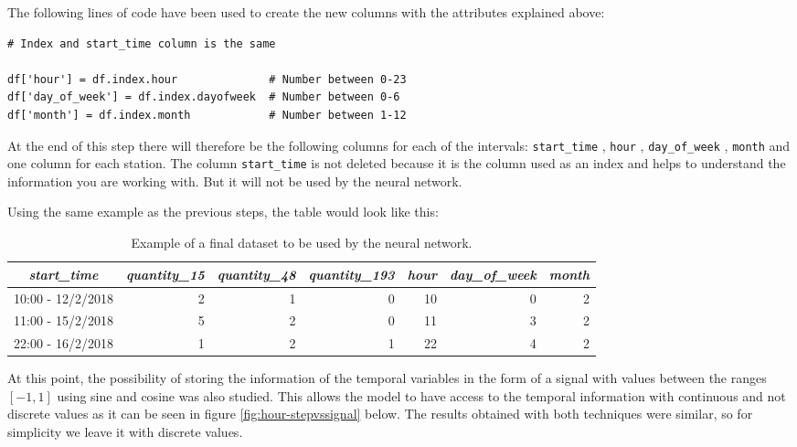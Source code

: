 \begin{enumerate}
  The following lines of code have been used to create the new columns with the attributes explained above:
    \begin{verbatim}
# Index and start_time column is the same

df['hour'] = df.index.hour              # Number between 0-23
df['day_of_week'] = df.index.dayofweek  # Number between 0-6
df['month'] = df.index.month            # Number between 1-12
    \end{verbatim}
    
    At the end of this step there will therefore be the following columns for each of the intervals: \small{\verb|start_time|} \normalsize , \small{\verb|hour|} \normalsize , \small{\verb|day_of_week|} \normalsize , \small{\verb|month|} \normalsize  and one column for each station. The column \small{\verb|start_time|} \normalsize  is not deleted because it is the column used as an index and helps to understand the information you are working with. But it will not be used by the neural network.
    \newline
    
    Using the same example as the previous steps, the table would look like this:
    \begin{table}[H]
    \footnotesize
    \centering
    \begin{tabular}{c|rrr|rrr}
        \toprule
        \textit{start\_time} & \textit{quantity\_15} & \textit{quantity\_48} & \textit{quantity\_193} & \textit{hour} & \textit{day\_of\_week} & \textit{month} \\
        \midrule
        10:00 - 12/2/2018 & 2 & 1 & 0 & 10 & 0 & 2 \\
        11:00 - 15/2/2018 & 5 & 2 & 0 & 11 & 3 & 2 \\
        22:00 - 16/2/2018 & 1 & 2 & 1 & 22 & 4 & 2 \\
        
        \bottomrule
    \end{tabular}
    \cprotect\caption{Example of a final dataset to be used by the neural network.}
    \label{tab:intervals_example}
    \end{table}
    
    
    At this point, the possibility of storing the information of the temporal variables in the form of a signal with values between the ranges $[-1, 1]$ using sine and cosine \cite{reddit_time} was also studied. This allows the model to have access to the temporal information with continuous and not discrete values as it can be seen in figure \ref{fig:hour-stepvssignal} below. The results obtained with both techniques were similar, so for simplicity we leave it with discrete values.
    

\end{enumerate}
